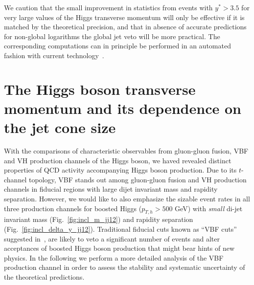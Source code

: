 \documentclass[10pt,prd,fleqn,superscriptaddress,notitlepage,nofootinbib,preprintnumbers,nobalancelastpage]{revtex4-1}
\begin{document}
We caution that the small improvement in statistics from events with $y^* >3.5$ for very large values of the Higgs transverse momentum will only be effective if it is matched by the theoretical precision, and that in absence of accurate predictions for non-global logarithms the global jet veto will be more practical. The corresponding computations can in principle be performed in an automated fashion with current technology~\cite{Gerwick:2014gya,Baberuxki:2019ifp,Baron:2020xoi,Caletti:2021oor}.


\section{The Higgs boson transverse momentum and its dependence on the jet cone size}
\label{sec:conesize}

With the comparisons of characteristic observables from gluon-gluon fusion, VBF and VH production channels of the Higgs boson, we haved revealed distinct properties of QCD activity accompanying Higgs boson production. Due to its $t$-channel topology, VBF stands out among gluon-gluon fusion and VH production channels in fiducial regions with large dijet invariant mass and rapidity separation. However, we would like to also emphasize the sizable event rates in all three production channels for boosted Higgs ($p_{T,h}>500$ GeV) with \emph{small} di-jet invariant mass (Fig.~\ref{fig:incl_m_jj12}) and rapidity separation (Fig.~\ref{fig:incl_delta_y_jj12}). Traditional fiducial cuts known as ``VBF cuts'' suggested in~\cite{Figy:2004pt,Ciccolini:2007ec,deFlorian:2016spz}, are likely to veto a significant number of events and alter acceptances of boosted Higgs boson production that might bear hints of new physics. In the following we perform a more detailed analysis of the VBF production channel in order to assess the stability and systematic uncertainty of the theoretical predictions.
\end{document}
